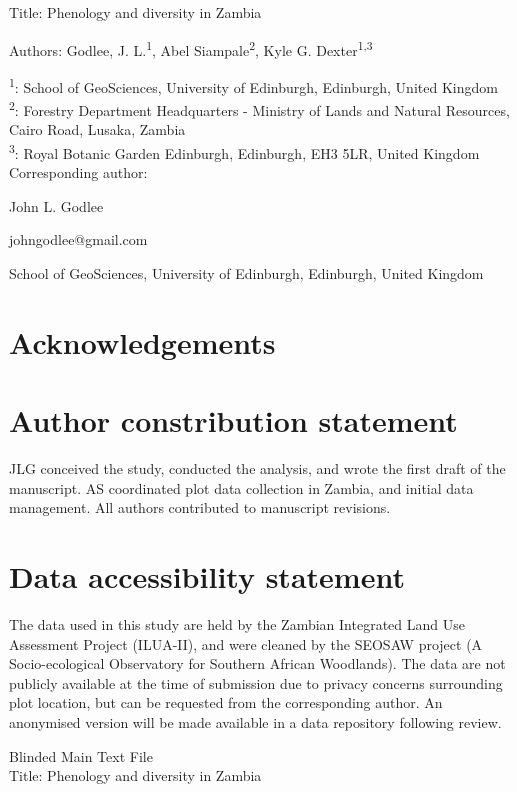 \documentclass[11pt,a4paper]{article}
\newcommand{\titletext}{Phenology and diversity in Zambia}
\begin{document}
{\Large{Title: \titletext{}}}

Authors: Godlee, J. L.\textsuperscript{1}, Abel Siampale\textsuperscript{2}, Kyle G. Dexter\textsuperscript{1,3}

\textsuperscript{1}: School of GeoSciences, University of Edinburgh, Edinburgh, United Kingdom \\
\textsuperscript{2}: Forestry Department Headquarters - Ministry of Lands and Natural Resources, Cairo Road, Lusaka, Zambia \\
\textsuperscript{3}: Royal Botanic Garden Edinburgh, Edinburgh, EH3 5LR, United Kingdom \\

\vspace{1em}
Corresponding author:

John L. Godlee

johngodlee@gmail.com

School of GeoSciences, University of Edinburgh, Edinburgh, United Kingdom

\section*{Acknowledgements}

\section*{Author constribution statement}

JLG conceived the study, conducted the analysis, and wrote the first draft of the manuscript. AS coordinated plot data collection in Zambia, and initial data management. All authors contributed to manuscript revisions.  

\section*{Data accessibility statement}

The data used in this study are held by the Zambian Integrated Land Use Assessment Project (ILUA-II), and were cleaned by the SEOSAW project (A Socio-ecological Observatory for Southern African Woodlands). The data are not publicly available at the time of submission due to privacy concerns surrounding plot location, but can be requested from the corresponding author. An anonymised version will be made available in a data repository following review.

\newpage{}
\linenumbers

{\Large{Blinded Main Text File}}\\
{\Large{Title: \titletext{}}}
\end{document}
